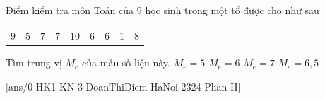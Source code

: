 \begin{ex}%
	Điểm kiểm tra môn Toán của $9$ học sinh trong một tổ được cho như sau
	\begin{center}
		\begin{tabular}{ccccccccc} 
			$9$&$5$&$7$&$7$&$10$&$6$&$6$&$1$&$8$
		\end{tabular}
	\end{center}
	Tìm trung vị $M_e$ của mẫu số liệu này.
	\choice
	{\True $M_e=5$}
	{$M_e=6$}
	{$M_e=7$}
	{$M_e=6{,}5$}
\end{ex}
\cauds
{}[ans/0-HK1-KN-3-DoanThiDiem-HaNoi-2324-Phan-II]
\setcounter{ex}{0}

